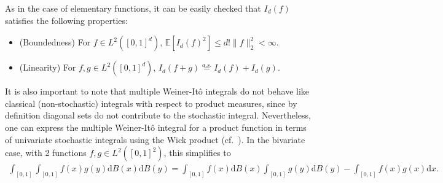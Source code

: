 \documentclass[11pt,reqno]{amsart}
\numberwithin{equation}{section}
\newcommand{\E}{\mathbb{E}}
\theoremstyle{definition}
\begin{document}
As in the case of elementary functions, it can be easily checked that $I_d(f)$ satisfies the following properties: 
\begin{itemize}

\item (Boundedness) For $f \in L^2([0, 1]^d)$, $\E[I_d(f)^2] \leq d! \|f\|_2^2 < \infty$.  

\item (Linearity) For $f, g\in L^2([0, 1]^d)$, 
$I_d(f+g) \stackrel{a.s.}{=} I_d(f)+I_d(g)$. 

\end{itemize}
It is also important to note that multiple Weiner-It\^{o} integrals do not behave like classical (non-stochastic) integrals with respect to product measures, since by definition diagonal sets do not contribute to the stochastic integral. Nevertheless, one can express the multiple Weiner-It\^{o} integral for a product function in terms of univariate stochastic integrals using the Wick product (cf.~\cite[Theorem 7.26]{gaussianhilbert}). In the bivariate case, with 2 functions $f, g \in L^2([0, 1]^2)$, this simplifies to  
\begin{align}\label{eq:fgstochasticintegral}
\int_{[0, 1]} \int_{[0, 1]} f(x) g(y) \mathrm d B(x) \mathrm d B(y) = \int_{[0, 1]} f(x) \mathrm d B(x)  \int_{[0, 1]} g(y) \mathrm d B(y) - \int_{[0, 1]} f(x) g(x) \mathrm d x . 
\end{align} 
\end{document}

